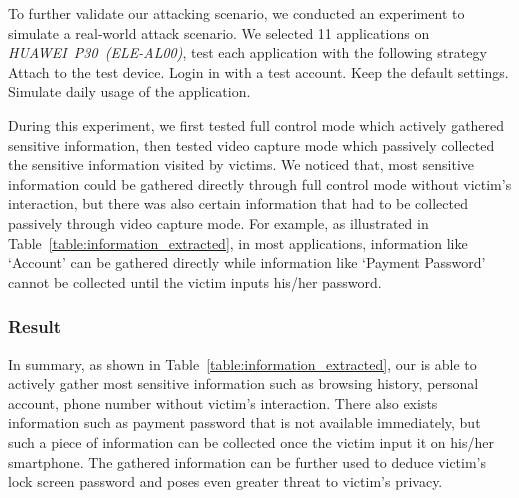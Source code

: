 
To further validate our attacking scenario, we conducted an experiment to simulate a real-world attack scenario. We selected 11 applications on  \mbox{\textit{HUAWEI P30 (ELE-AL00)}}, test each application with the following strategy
 Attach \tool to the test device.
 Login in with a test account.
 Keep the default settings.
 Simulate daily usage of the application.

During this experiment, we first tested full control mode which actively gathered sensitive information, then tested video capture mode which passively collected the sensitive information visited by victims. We noticed that, most sensitive information could be gathered directly through full control mode without victim's interaction, but there was also certain information that had to be collected passively through video capture mode. For example, as illustrated in Table~\ref{table:information_extracted}, in most applications, information like `Account' can be gathered directly while information like `Payment Password' cannot be collected until the victim inputs his/her password.


\subsubsection{Result}
In summary, as shown in Table~\ref{table:information_extracted}, our \tool is able to actively gather most sensitive information such as browsing history, personal account, phone number without victim's interaction. There also exists information such as payment password that is not available immediately, but such a piece of information can be collected once the victim input it on his/her smartphone. The gathered information can be further used to deduce victim's lock screen password and poses even greater threat to victim's privacy.

